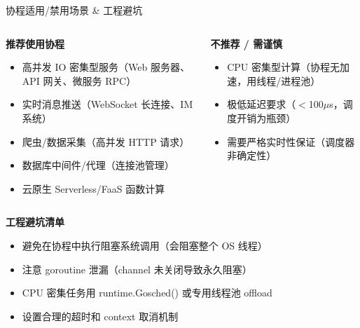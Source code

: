 \begin{frame}{协程适用/禁用场景 \& 工程避坑}
  \begin{columns}[T]
    \begin{exampleblock}{\textbf{推荐使用协程}}
      \begin{itemize}
        \item 高并发 IO 密集型服务（Web 服务器、API 网关、微服务 RPC）
        \item 实时消息推送（WebSocket 长连接、IM 系统）
        \item 爬虫/数据采集（高并发 HTTP 请求）
        \item 数据库中间件/代理（连接池管理）
        \item 云原生 Serverless/FaaS 函数计算
      \end{itemize}
    \end{exampleblock}

    \begin{alertblock}{\textbf{不推荐 / 需谨慎}}
      \begin{itemize}
        \item CPU 密集型计算（协程无加速，用线程/进程池）
        \item 极低延迟要求（$<$100$\mu$s，调度开销为瓶颈）
        \item 需要严格实时性保证（调度器非确定性）
      \end{itemize}
    \end{alertblock}

    \vspace{0.3em}
  \end{columns}

  \vspace{0.3em}
  \begin{block}{\textbf{工程避坑清单}}
    \begin{itemize}
      \item 避免在协程中执行阻塞系统调用（会阻塞整个 OS 线程）
      \item 注意 goroutine 泄漏（channel 未关闭导致永久阻塞）
      \item CPU 密集任务用 runtime.Gosched() 或专用线程池 offload
      \item 设置合理的超时和 context 取消机制
    \end{itemize}
  \end{block}
\end{frame}

